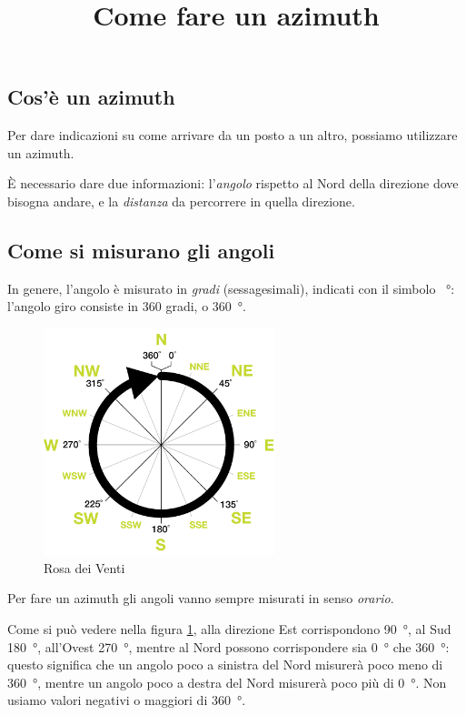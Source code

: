 \documentclass[12pt]{article}
\title{Come fare un azimuth}
\author{}
\begin{document}
\maketitle

\subsection*{Cos'è un azimuth}

Per dare indicazioni su come arrivare da un posto a un altro, possiamo utilizzare un azimuth. 

È necessario dare due informazioni: l'\emph{angolo} rispetto al Nord della direzione dove bisogna andare, e la \emph{distanza} da percorrere in quella direzione. 

\subsection*{Come si misurano gli angoli}

In genere, l'angolo è misurato in \emph{gradi} (sessagesimali), indicati con il simbolo \SI{}{\degree}: l'angolo giro consiste in 360 gradi, o \SI{360}{\degree}. 

\begin{figure}[H]
\centering
\includegraphics[width=0.6\textwidth]{CompassRoseSimple.png}
\caption{Rosa dei Venti}
\label{fig:rosa-venti}
\end{figure}

Per fare un azimuth gli angoli vanno sempre misurati in senso \emph{orario}. 

Come si può vedere nella figura \ref{fig:rosa-venti}, alla direzione Est corrispondono \SI{90}{\degree}, al Sud \SI{180}{\degree}, all'Ovest \SI{270}{\degree}, mentre al Nord possono corrispondere sia \SI{0}{\degree} che \SI{360}{\degree}: questo significa che un angolo poco a sinistra del Nord misurerà poco meno di \SI{360}{\degree}, mentre un angolo poco a destra del Nord misurerà poco più di \SI{0}{\degree}. Non usiamo valori negativi o maggiori di \SI{360}{\degree}. 
\end{document}
